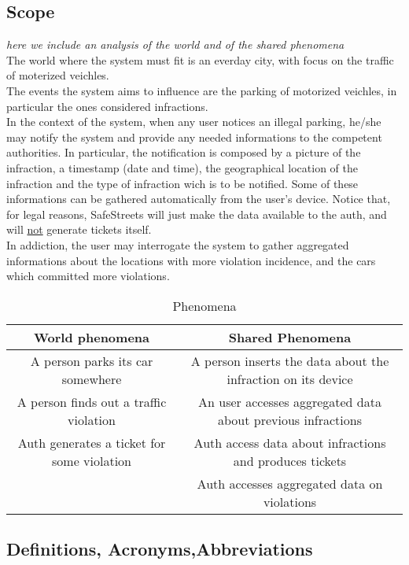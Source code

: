 \documentclass{article}
\begin{document}
	\subsection{Scope} \textit{here we include an analysis of the world and of the shared phenomena}\\
	The world where the system must fit is an everday city, with focus on the traffic of moterized veichles.\\
	The events the system aims to influence are the parking of motorized veichles,  in particular the ones considered infractions.\\
	In the context of the system, when any user notices an illegal parking, he/she may notify the system and provide any needed informations to the competent authorities. In particular, the notification is composed by a picture of the infraction, a timestamp (date and time), the geographical location of the infraction and the type of infraction wich is to be notified. Some of these informations can be gathered automatically from the user's device. Notice that, for legal reasons, SafeStreets will just make the data available to the auth, and will \underline{not} generate tickets itself. \\
	In addiction, the user may interrogate the system to gather aggregated informations about the locations with more violation incidence, and the cars which committed more violations. 
		\begin{table}[h]
			\begin{center}
				\caption{Phenomena}
				\small
				\label{Phenomena}
				\begin{tabular}{c|c}
					\textbf{World phenomena}&\textbf{Shared Phenomena}\\
					\hline
					A person parks its car somewhere&A person inserts the data about the infraction on its device\\
					A person finds out a traffic violation&An user accesses aggregated data about previous infractions\\
					\hline
					Auth generates a ticket for some violation&Auth access data about infractions and produces tickets\\
					&Auth accesses aggregated data on violations\\
					
				\end{tabular}
			\end{center}
		\end{table}
	\subsection{Definitions, Acronyms,Abbreviations} \label{definitions}
\end{document}
